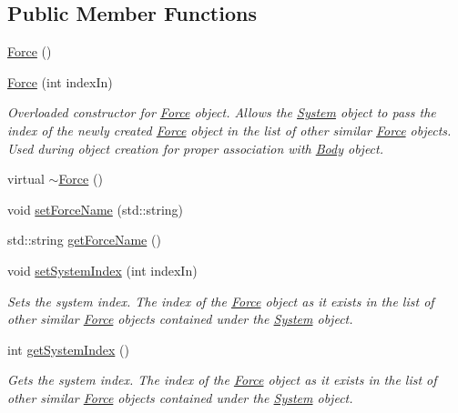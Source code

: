 \subsection*{Public Member Functions}
\begin{DoxyCompactItemize}
\item 
\hyperlink{classosea_1_1ofreq_1_1_force_a00983e3bbc206a00bb9253deafc4e424}{Force} ()
\item 
\hyperlink{classosea_1_1ofreq_1_1_force_a17b130fe437ef6c78162f6d4fb7fc909}{Force} (int index\-In)
\begin{DoxyCompactList}\small\item\em Overloaded constructor for \hyperlink{classosea_1_1ofreq_1_1_force}{Force} object. Allows the \hyperlink{classosea_1_1ofreq_1_1_system}{System} object to pass the index of the newly created \hyperlink{classosea_1_1ofreq_1_1_force}{Force} object in the list of other similar \hyperlink{classosea_1_1ofreq_1_1_force}{Force} objects. Used during object creation for proper association with \hyperlink{classosea_1_1ofreq_1_1_body}{Body} object. \end{DoxyCompactList}\item 
virtual \hyperlink{classosea_1_1ofreq_1_1_force_a8767ca332cee738a462befe1bfbfa454}{$\sim$\-Force} ()
\item 
void \hyperlink{classosea_1_1ofreq_1_1_force_afda991c33f4b65e82b246b24c39f0923}{set\-Force\-Name} (std\-::string)
\item 
std\-::string \hyperlink{classosea_1_1ofreq_1_1_force_a8431fcc0edd27e3edb77f8176bec6908}{get\-Force\-Name} ()
\item 
void \hyperlink{classosea_1_1ofreq_1_1_force_aee052df1c632a6dfb323b5deac443684}{set\-System\-Index} (int index\-In)
\begin{DoxyCompactList}\small\item\em Sets the system index. The index of the \hyperlink{classosea_1_1ofreq_1_1_force}{Force} object as it exists in the list of other similar \hyperlink{classosea_1_1ofreq_1_1_force}{Force} objects contained under the \hyperlink{classosea_1_1ofreq_1_1_system}{System} object. \end{DoxyCompactList}\item 
int \hyperlink{classosea_1_1ofreq_1_1_force_a8cce0e20d734d02c5c52c8ca1f1bde54}{get\-System\-Index} ()
\begin{DoxyCompactList}\small\item\em Gets the system index. The index of the \hyperlink{classosea_1_1ofreq_1_1_force}{Force} object as it exists in the list of other similar \hyperlink{classosea_1_1ofreq_1_1_force}{Force} objects contained under the \hyperlink{classosea_1_1ofreq_1_1_system}{System} object. \end{DoxyCompactList}\end{DoxyCompactItemize}

